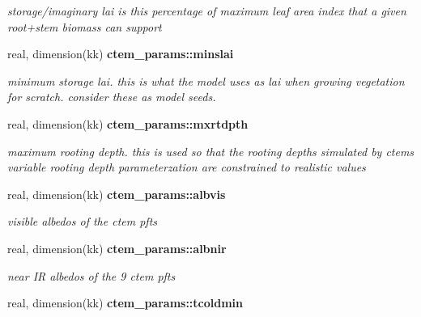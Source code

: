 \begin{DoxyCompactItemize}
\begin{DoxyCompactList}\small\item\em storage/imaginary lai is this percentage of maximum leaf area index that a given root+stem biomass can support \end{DoxyCompactList}\item 
\hypertarget{namespacectem__params_af7fddd21a0baea756dfde3683a67ec83}{}real, dimension(kk) {\bfseries ctem\+\_\+params\+::minslai}\label{namespacectem__params_af7fddd21a0baea756dfde3683a67ec83}

\begin{DoxyCompactList}\small\item\em minimum storage lai. this is what the model uses as lai when growing vegetation for scratch. consider these as model seeds. \end{DoxyCompactList}\item 
\hypertarget{namespacectem__params_aa04ff0cae9a12857edb2bced344e57eb}{}real, dimension(kk) {\bfseries ctem\+\_\+params\+::mxrtdpth}\label{namespacectem__params_aa04ff0cae9a12857edb2bced344e57eb}

\begin{DoxyCompactList}\small\item\em maximum rooting depth. this is used so that the rooting depths simulated by ctem\textquotesingle{}s variable rooting depth parameterzation are constrained to realistic values \end{DoxyCompactList}\item 
\hypertarget{namespacectem__params_a31818df48fa008f61e322e702577c978}{}real, dimension(kk) {\bfseries ctem\+\_\+params\+::albvis}\label{namespacectem__params_a31818df48fa008f61e322e702577c978}

\begin{DoxyCompactList}\small\item\em visible albedos of the ctem pfts \end{DoxyCompactList}\item 
\hypertarget{namespacectem__params_a40fb68ad0ca75f0de54aa2ced6257788}{}real, dimension(kk) {\bfseries ctem\+\_\+params\+::albnir}\label{namespacectem__params_a40fb68ad0ca75f0de54aa2ced6257788}

\begin{DoxyCompactList}\small\item\em near I\+R albedos of the 9 ctem pfts \end{DoxyCompactList}\item 
\hypertarget{namespacectem__params_aa39eead45599d5797ad7bd80168fb657}{}real, dimension(kk) {\bfseries ctem\+\_\+params\+::tcoldmin}\label{namespacectem__params_aa39eead45599d5797ad7bd80168fb657}


\end{DoxyCompactItemize}
